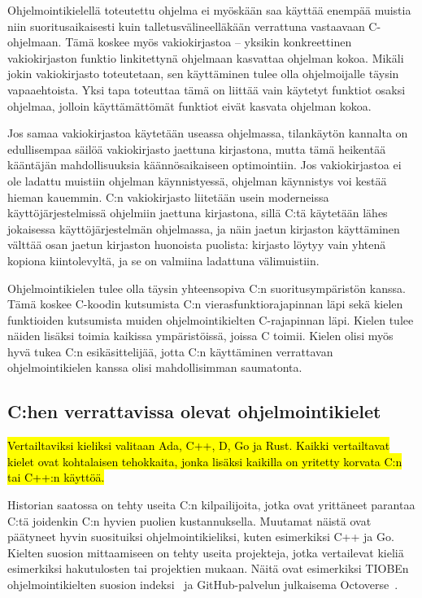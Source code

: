Ohjelmointikielellä toteutettu ohjelma ei myöskään saa käyttää enempää muistia
niin suoritusaikaisesti kuin talletusvälineelläkään verrattuna vastaavaan
C-ohjelmaan. Tämä koskee myös vakiokirjastoa --
yksikin konkreettinen vakiokirjaston funktio linkitettynä ohjelmaan kasvattaa
ohjelman kokoa. Mikäli jokin vakiokirjasto toteutetaan, sen käyttäminen tulee
olla ohjelmoijalle täysin vapaaehtoista. Yksi tapa toteuttaa tämä on liittää
vain käytetyt funktiot osaksi ohjelmaa, jolloin käyttämättömät funktiot eivät
kasvata ohjelman kokoa.

Jos samaa vakiokirjastoa käytetään useassa ohjelmassa, tilankäytön kannalta on
edullisempaa säilöä vakiokirjasto jaettuna kirjastona, mutta tämä heikentää
kääntäjän mahdollisuuksia käännösaikaiseen optimointiin. Jos vakiokirjastoa ei
ole ladattu muistiin ohjelman käynnistyessä, ohjelman käynnistys voi kestää
hieman kauemmin. C:n vakiokirjasto liitetään usein moderneissa
käyttöjärjestelmissä ohjelmiin jaettuna kirjastona, sillä C:tä käytetään lähes
jokaisessa käyttöjärjestelmän ohjelmassa, ja näin jaetun kirjaston käyttäminen
välttää osan jaetun kirjaston huonoista puolista: kirjasto löytyy vain yhtenä
kopiona kiintolevyltä, ja se on valmiina ladattuna välimuistiin.

\newpage

Ohjelmointikielen tulee olla täysin yhteensopiva C:n suoritusympäristön kanssa.
Tämä koskee C-koodin kutsumista C:n vierasfunktiorajapinnan
läpi sekä kielen funktioiden kutsumista
muiden ohjelmointikielten C-rajapinnan läpi. Kielen tulee näiden lisäksi toimia
kaikissa ympäristöissä, joissa C toimii. Kielen olisi myös hyvä tukea C:n
esikäsittelijää, jotta C:n käyttäminen verrattavan ohjelmointikielen kanssa
olisi mahdollisimman saumatonta.

\subsection{C:hen verrattavissa olevat ohjelmointikielet}

\hl{Vertailtaviksi kieliksi valitaan Ada, C++, D, Go ja Rust. Kaikki
vertailtavat kielet ovat kohtalaisen tehokkaita, jonka lisäksi kaikilla on
yritetty korvata C:n tai C++:n käyttöä.}

Historian saatossa on tehty useita C:n kilpailijoita, jotka ovat yrittäneet
parantaa C:tä joidenkin C:n hyvien puolien kustannuksella. Muutamat näistä ovat
päätyneet hyvin suosituiksi ohjelmointikieliksi, kuten esimerkiksi C++ ja Go.
Kielten suosion mittaamiseen on tehty useita projekteja, jotka vertailevat
kieliä esimerkiksi hakutulosten tai projektien mukaan. Näitä ovat esimerkiksi
TIOBEn ohjelmointikielten suosion indeksi~\citep{tiobe} ja GitHub-palvelun
julkaisema \mbox{Octoverse}~\citep{octoverse}.

